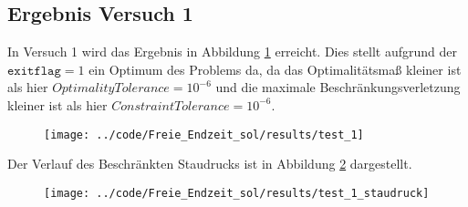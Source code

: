 \subsection{Ergebnis Versuch 1}\label{kap:Versuch1_OptTf}
In Versuch 1 wird das Ergebnis in Abbildung \ref{img:test_1_OptTf} erreicht. Dies stellt aufgrund der $\texttt{exitflag} = 1$ ein Optimum des Problems da, da das Optimalitätsmaß kleiner ist als hier $OptimalityTolerance = 10^{-6}$ und die maximale Beschränkungsverletzung kleiner ist als hier $ConstraintTolerance = 10^{-6}$.
\begin{figure}[H]
\begin{center}
\texttt{[image: ../code/Freie\_Endzeit\_sol/results/test\_1]}
\label{img:test_1_OptTf}
\end{center}
\end{figure}
Der Verlauf des Beschränkten Staudrucks ist in Abbildung \ref{img:test_1_staudruck_OptTf} dargestellt.
\begin{figure}[H]
\begin{center}
\texttt{[image: ../code/Freie\_Endzeit\_sol/results/test\_1\_staudruck]}
\label{img:test_1_staudruck_OptTf}
\end{center}
\end{figure}